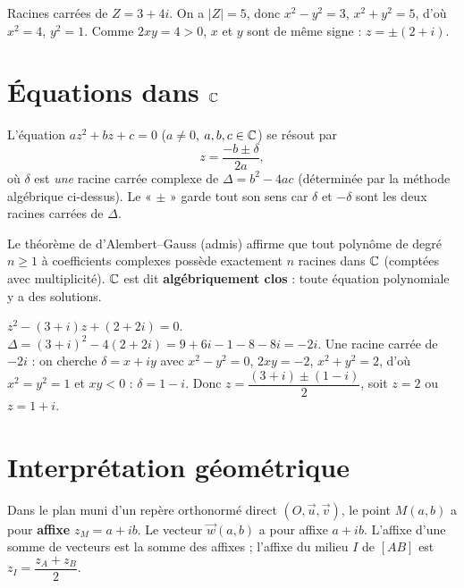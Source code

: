 \begin{exemple}
Racines carrées de $Z=3+4i$. On a $|Z|=5$, donc $x^{2}-y^{2}=3$, $x^{2}+y^{2}=5$, d'où $x^{2}=4$,
$y^{2}=1$. Comme $2xy=4>0$, $x$ et $y$ sont de même signe : $z=\pm(2+i)$.
\end{exemple}

\section{Équations dans $\mathbb{C}$}

\begin{theoreme}
L'équation $az^{2}+bz+c=0$ ($a\neq0$, $a,b,c\in\mathbb{C}$) se résout par
\[
z=\frac{-b\pm\delta}{2a},
\]
où $\delta$ est \emph{une} racine carrée complexe de $\Delta=b^{2}-4ac$ (déterminée par la méthode
algébrique ci-dessus). Le « $\pm$ » garde tout son sens car $\delta$ et $-\delta$ sont les deux
racines carrées de $\Delta$.
\end{theoreme}

\begin{remarque}
Le théorème de d'Alembert--Gauss (admis) affirme que tout polynôme de degré $n\ge1$ à coefficients
complexes possède exactement $n$ racines dans $\mathbb{C}$ (comptées avec multiplicité). $\mathbb{C}$ est dit
\textbf{algébriquement clos} : toute équation polynomiale y a des solutions.
\end{remarque}

\begin{exemple}
$z^{2}-(3+i)z+(2+2i)=0$. $\Delta=(3+i)^{2}-4(2+2i)=9+6i-1-8-8i=-2i$. Une racine carrée de $-2i$ :
on cherche $\delta=x+iy$ avec $x^{2}-y^{2}=0$, $2xy=-2$, $x^{2}+y^{2}=2$, d'où $x^{2}=y^{2}=1$ et
$xy<0$ : $\delta=1-i$. Donc $z=\dfrac{(3+i)\pm(1-i)}{2}$, soit $z=2$ ou $z=1+i$.
\end{exemple}

\section{Interprétation géométrique}

\begin{definition}
Dans le plan muni d'un repère orthonormé direct $(O,\vec u,\vec v)$, le point $M(a,b)$ a pour
\textbf{affixe} $z_M=a+ib$. Le vecteur $\vec w(a,b)$ a pour affixe $a+ib$. L'affixe d'une somme de
vecteurs est la somme des affixes ; l'affixe du milieu $I$ de $[AB]$ est
$z_I=\dfrac{z_A+z_B}{2}$.
\end{definition}

